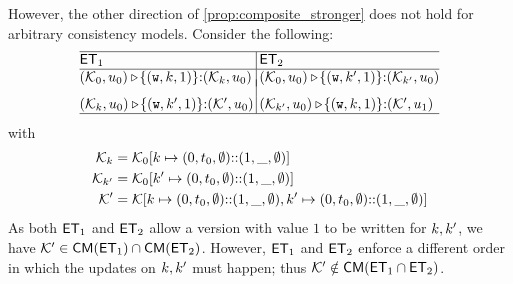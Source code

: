 However, the other direction of \cref{prop:composite_stronger} does not hold for arbitrary consistency models.
Consider the following:
\[
\small
\begin{array}{@{}l @{\hspace{2pt}} | @{\hspace{2pt}} l@{}}
    \hline
    \ET_1 & \ET_2 \\
%    
    \hline
    (\hh_{0}, \vi_{0}) \csat\! \{(\otW, \ke, 1)\} {:} ( \hh_{\ke}, \vi_{0})
    &
    (\hh_{0}, \vi_{0}) \csat\! \{(\otW, \ke', 1)\} {:} ( \hh_{\ke'}, \vi_{0}) 
    \vspace{-5pt}\\\\
    (\hh_{\ke}, \vi_{0}) \csat  \!\{(\otW, \ke', 1)\} {:} (\hh',\vi_{0}) 
    &
    (\hh_{\ke'}, \vi_{0}) \csat \!\{(\otW, \ke, 1)\} {:} (\hh',\vi_{1}) 
    \\
\hline
\end{array}
\]
with 
\begin{align*}
    \mathcal{K}_{k} & = \mathcal{K}_{0}[k \mapsto (0, t_{0}, \emptyset) \mathbb{::} (1, \_, \emptyset)] \\
    \mathcal{K}_{k'} & = \mathcal{K}_{0}[k' \mapsto (0, t_{0}, \emptyset) \mathbb{::} (1, \_, \emptyset)] \\
    \mathcal{K}' & = \mathcal{K}[k \mapsto (0, t_{0}, \emptyset) \mathbb{::} (1, \_, \emptyset) 
                ,k' \mapsto (0, t_{0}, \emptyset) \mathbb{::} (1, \_, \emptyset)] \\
\end{align*}
As both $\mathsf{ET}_1$ and $\mathsf{ET}_2$ allow a version with value $1$ to be written for 
$k, k'$,  we have $\mathcal{K}' \in \mathsf{CM}(\mathsf{ET}_1) \cap \mathsf{CM}(\mathsf{ET}_2)$. 
However, $\mathsf{ET}_1$ and $\mathsf{ET}_2$ enforce a different order in which the updates on $k, k'$ must happen; 
thus $\mathcal{K}' \notin \mathsf{CM}(\mathsf{ET}_1 \cap \mathsf{ET}_2)$. 

